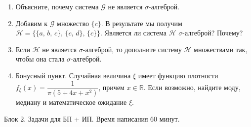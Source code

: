 \begin{enumerate}
\begin{enumerate}
     \item Объясните, почему система $\mathcal{G}$ не является $\sigma$-алгеброй.

    \item Добавим к $\mathcal{G}$ множество $\{c\}$. 
    В результате мы получим $\mathcal{H} = \bigl\{ \{a, \, b, \, c\}, \, \{c, \, d\}, \, \{c\}\bigr\}$. 
    Является ли система $\mathcal{H}$ $\sigma$-алгеброй? Почему?

    \item Если $\mathcal{H}$ не является $\sigma$-алгеброй, 
    то дополните систему $\mathcal{H}$ множествами так, чтобы она стала $\sigma$-алгеброй.

    \item Бонусный пункт. Случайная величина $\xi$ имеет функцию плотности
    $f_{\xi}(x) = 
    \dfrac{1}{\pi(5+4x+x^2)}
    $, причем $x \in \mathbb{R}$. 
    Если возможно, найдите моду, медиану и математическое ожидание $\xi$.
\end{enumerate}

\end{enumerate}


Блок 2. Задачи для БП + ИП. Время написания 60 минут. 

